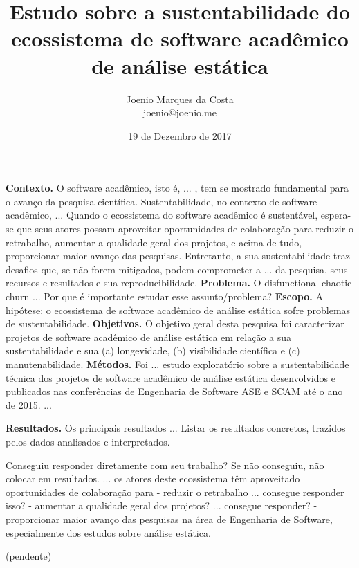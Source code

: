 \documentclass[msc, classic, a4paper]{ufbathesis}
\date{19 de Dezembro de 2017}
\title{
  Estudo sobre a sustentabilidade do ecossistema de software acadêmico de
  análise estática
}
\author{Joenio Marques da Costa\\
  {\small joenio@joenio.me}
}
\begin{document}
\frontpage
\frontmatter
\presentationpage

\resumo

\textbf{Contexto.} 
O software acadêmico, isto é, ... ,
tem se mostrado fundamental para o avanço da pesquisa científica.
%
Sustentabilidade, no contexto de software acadêmico,  ...
%
Quando o ecossistema do software acadêmico é sustentável, espera-se que seus atores possam aproveitar
oportunidades de colaboração para reduzir o retrabalho, aumentar a qualidade
geral dos projetos, e acima de tudo, proporcionar maior avanço das pesquisas.
%
Entretanto, a sua sustentabilidade traz desafios que, se não forem mitigados,
podem comprometer a ... da pesquisa, seus recursos e resultados e sua reproducibilidade.
%
\textbf{Problema.} 
O disfunctional chaotic churn ...
Por que é importante estudar esse assunto/problema?
%
\textbf{Escopo.} 
A hipótese: o ecossistema de software acadêmico de análise
estática sofre problemas de sustentabilidade.
%
\textbf{Objetivos.}
O objetivo geral desta pesquisa foi caracterizar projetos de software acadêmico de análise estática 
em relação a sua sustentabilidade e sua (a) longevidade, (b) visibilidade científica e (c) manutenabilidade.
%
\textbf{Métodos.}
Foi ... estudo exploratório sobre a sustentabilidade
técnica dos projetos de software acadêmico de análise estática desenvolvidos e
publicados nas conferências de Engenharia de Software ASE e SCAM até o ano de
2015.
...

\textbf{Resultados.}
Os principais resultados ...
Listar os resultados concretos, trazidos pelos dados analisados e interpretados.


Conseguiu responder diretamente com seu trabalho? Se não conseguiu, não colocar em resultados. 
... os atores deste ecossistema têm aproveitado oportunidades de colaboração para 
 - reduzir o retrabalho ... consegue responder isso?
- aumentar a qualidade geral dos projetos? ... consegue responder?
- proporcionar maior avanço das pesquisas na área de Engenharia de Software, 
especialmente dos estudos sobre análise estática.

\begin{keywords}

  (pendente)

\end{keywords}

\tableofcontents
\listoffigures
\listoftables

\mainmatter
\end{document}
